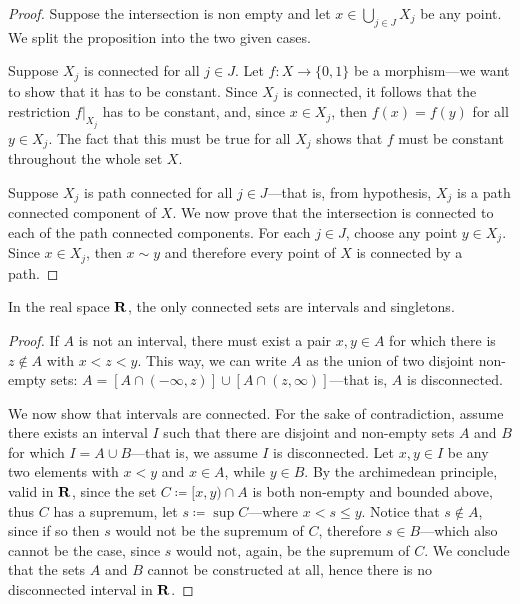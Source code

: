 \begin{proof}
    Suppose the intersection is non empty and let \(x \in \bigcup_{j \in J}
    X_j\) be any point. We split the proposition into the two given cases.

    Suppose \(X_j\) is connected for all \(j \in J\). Let \(f: X \to \{0, 1\}\) be a
    morphism---we want to show that it has to be constant. Since \(X_j\) is
    connected, it follows that the restriction \(f|_{X_j}\) has to be constant, and,
    since \(x \in X_j\), then \(f(x) = f(y)\) for all \(y \in X_j\). The fact that
    this must be true for all \(X_j\) shows that \(f\) must be constant throughout
    the whole set \(X\).

    Suppose \(X_j\) is path connected for all \(j \in J\)---that is, from
    hypothesis, \(X_j\) is a path connected component of \(X\). We now prove that
    the intersection is connected to each of the path connected components. For each
    \(j \in J\), choose any point \(y \in X_j\). Since \(x \in X_j\), then
    \(x \sim y\) and therefore every point of \(X\) is connected by a path.
\end{proof}

\begin{theorem}
    \label{thm:connected-interval-real-space}
    In the real space \(\mathbf{R}\), the only connected sets are intervals and singletons.
\end{theorem}

\begin{proof}
    If \(A\) is not an interval, there must exist a pair \(x, y \in A\) for which
    there is \(z \notin A\) with \(x < z < y\). This way, we can write \(A\) as the
    union of two disjoint non-empty sets:
    \(A = [A \cap (-\infty, z)] \cup [A \cap (z, \infty)]\)---that is, \(A\) is
    disconnected.

    We now show that intervals are connected. For the sake of contradiction, assume
    there exists an interval \(I\) such that there are disjoint and non-empty sets
    \(A\) and \(B\) for which \(I = A \cup B\)---that is, we assume \(I\) is
    disconnected. Let \(x, y \in I\) be any two elements with \(x < y\) and
    \(x \in A\), while \(y \in B\). By the archimedean principle, valid in \(\mathbf{R}\),
    since the set \(C \coloneq [x, y) \cap A\) is both non-empty and bounded above,
    thus \(C\) has a supremum, let \(s \coloneq \sup C\)---where \(x < s \leq
    y\). Notice that \(s \notin A\), since if so then \(s\) would not be the
    supremum of \(C\), therefore \(s \in B\)---which also cannot be the case,
    since \(s\) would not, again, be the supremum of \(C\). We conclude that the
    sets \(A\) and \(B\) cannot be constructed at all, hence there is no
    disconnected interval in \(\mathbf{R}\).
\end{proof}

